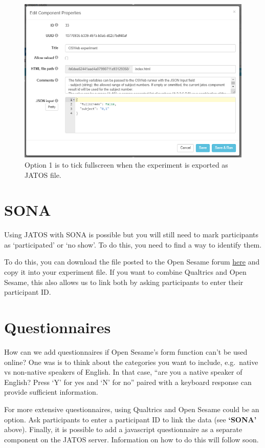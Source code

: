 \documentclass[
]{book}
\begin{document}
\begin{figure}

{\centering \includegraphics[width=0.99\linewidth]{images/opensesame/fullscreen2} 

}

\caption{Option 1 is to tick fullscreen when the experiment is exported as JATOS file.}\label{fig:Figure13-3}
\end{figure}

\hypertarget{sona}{%
\section{SONA}\label{sona}}

Using JATOS with SONA is possible but you will still need to mark participants as `participated' or `no show'. To do this, you need to find a way to identify them.

To do this, you can download the file posted to the Open Sesame forum \href{https://forum.cogsci.nl/discussion/5876/}{here} and copy it into your experiment file. If you want to combine Qualtrics and Open Sesame, this also allows us to link both by asking participants to enter their participant ID.

\hypertarget{questionnaires}{%
\section{Questionnaires}\label{questionnaires}}

How can we add questionnaires if Open Sesame's form function can't be used online? One was is to think about the categories you want to include, e.g.~native vs non-native speakers of English. In that case, ``are you a native speaker of English? Press `Y' for yes and `N' for no'' paired with a keyboard response can provide sufficient information.

For more extensive questionnaires, using Qualtrics and Open Sesame could be an option. Ask participants to enter a participant ID to link the data (see \textbf{`SONA'} above). Finally, it is possible to add a javascript questionnaire as a separate component on the JATOS server. Information on how to do this will follow soon.
\end{document}
